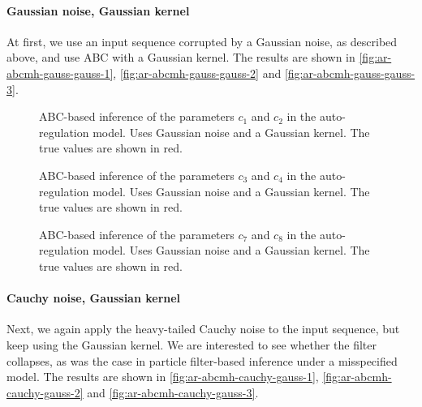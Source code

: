 \paragraph{Gaussian noise, Gaussian kernel}
At first, we use an input sequence corrupted by a Gaussian noise, as described above, and use ABC with a Gaussian kernel. The results are shown in \autoref{fig:ar-abcmh-gauss-gauss-1}, \autoref{fig:ar-abcmh-gauss-gauss-2} and \autoref{fig:ar-abcmh-gauss-gauss-3}.

\begin{figure}[htp]%
    \centering
    \qquad
    \caption{ABC-based inference of the parameters $c_1$ and $c_2$ in the auto-regulation model. Uses Gaussian noise and a Gaussian kernel. The true values are shown in red.}%
    \label{fig:ar-abcmh-gauss-gauss-1}%
\end{figure}

\begin{figure}[htp]%
    \centering
    \qquad
    \caption{ABC-based inference of the parameters $c_3$ and $c_4$ in the auto-regulation model. Uses Gaussian noise and a Gaussian kernel. The true values are shown in red.}%
    \label{fig:ar-abcmh-gauss-gauss-2}%
\end{figure}

\begin{figure}[htp]%
    \centering
    \qquad
    \caption{ABC-based inference of the parameters $c_7$ and $c_8$ in the auto-regulation model. Uses Gaussian noise and a Gaussian kernel. The true values are shown in red.}%
    \label{fig:ar-abcmh-gauss-gauss-3}%
\end{figure}


\paragraph{Cauchy noise, Gaussian kernel}
Next, we again apply the heavy-tailed Cauchy noise to the input sequence, but keep using the Gaussian kernel. We are interested to see whether the filter collapses, as was the case in particle filter-based inference under a misspecified model. The results are shown in \autoref{fig:ar-abcmh-cauchy-gauss-1}, \autoref{fig:ar-abcmh-cauchy-gauss-2} and \autoref{fig:ar-abcmh-cauchy-gauss-3}.


